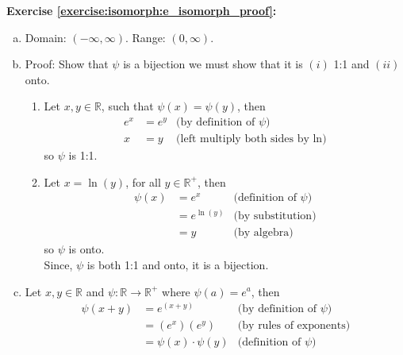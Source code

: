 \noindent\textbf{Exercise \ref{exercise:isomorph:e_isomorph_proof}:}
\begin{enumerate}[(a)]
\item
Domain: $(-\infty, \infty)$.  Range: $(0, \infty)$.

\item
Proof: Show that $\psi$ is a bijection we must show that it is $(i)$ 1:1 and $(ii)$ onto.
	\begin{enumerate}[($i$)]
	\item
	Let $x, y \in {\mathbb R}$, such that $\psi(x) = \psi(y)$, then
	\begin{align*}
	e^x &= e^y &\text{(by definition of\ } \psi)
	\\
	x &= y &\text{(left multiply both sides by ln)}
	\end{align*}
	so $\psi$ is 1:1.

	\item
	Let $x = \ln(y)$, for all $y \in {\mathbb R}^+$, then
	\begin{align*}
	\psi(x) &= e^x &\text{(definition of\ } \psi)
	\\
	&= e^{\ln(y)} &\text{(by substitution)}
	\\
	&= y &\text{(by algebra)}
	\end{align*}
	so $\psi$ is onto.
	\\
	Since, $\psi$ is both 1:1 and onto, it is a bijection. 
	\\
	\end{enumerate}

\item
Let $x, y \in {\mathbb R}$ and $\psi: {\mathbb R} \rightarrow {\mathbb R}^+$ where $\psi(a) = e^a$, then
\begin{align*}
\psi(x + y) &= e^{(x + y)} &\text{(by definition of\ } \psi)
\\
&= (e^x)(e^y) &\text{(by rules of exponents)}
\\
&= \psi(x) \cdot \psi(y) &\text{(definition of\ } \psi)
\end{align*}


\end{enumerate}
